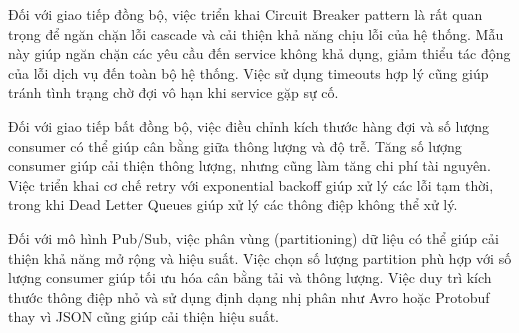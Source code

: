 Đối với giao tiếp đồng bộ, việc triển khai Circuit Breaker pattern là rất quan trọng để ngăn chặn lỗi cascade và cải thiện khả năng chịu lỗi của hệ thống. Mẫu này giúp ngăn chặn các yêu cầu đến service không khả dụng, giảm thiểu tác động của lỗi dịch vụ đến toàn bộ hệ thống. Việc sử dụng timeouts hợp lý cũng giúp tránh tình trạng chờ đợi vô hạn khi service gặp sự cố.

Đối với giao tiếp bất đồng bộ, việc điều chỉnh kích thước hàng đợi và số lượng consumer có thể giúp cân bằng giữa thông lượng và độ trễ. Tăng số lượng consumer giúp cải thiện thông lượng, nhưng cũng làm tăng chi phí tài nguyên. Việc triển khai cơ chế retry với exponential backoff giúp xử lý các lỗi tạm thời, trong khi Dead Letter Queues giúp xử lý các thông điệp không thể xử lý.

Đối với mô hình Pub/Sub, việc phân vùng (partitioning) dữ liệu có thể giúp cải thiện khả năng mở rộng và hiệu suất. Việc chọn số lượng partition phù hợp với số lượng consumer giúp tối ưu hóa cân bằng tải và thông lượng. Việc duy trì kích thước thông điệp nhỏ và sử dụng định dạng nhị phân như Avro hoặc Protobuf thay vì JSON cũng giúp cải thiện hiệu suất.